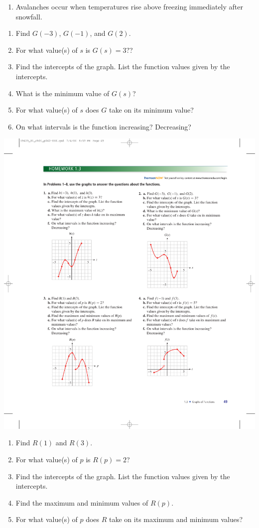 \documentclass[10pt,]{book}
\theoremstyle{plain}
\theoremstyle{definition}
\theoremstyle{definition}
\theoremstyle{definition}
\theoremstyle{definition}
\numberwithin{equation}{part}
\begin{document}
\begin{exercisegroup}
\begin{enumerate}[label=*\alph**]
\item\hypertarget{li-662}{}Avalanches occur when temperatures rise above freezing immediately after snowfall.%
\end{enumerate}
%
\exercise[2.]\hypertarget{exercise-159}{}\leavevmode%
\begin{enumerate}[label=*\alph**]
\item\hypertarget{li-663}{}Find \(G(-3)\), \(G(-1)\), and \(G(2)\).%
\item\hypertarget{li-664}{}For what value(s) of \(s\) is \(G(s) = 3?\)?%
\item\hypertarget{li-665}{}Find the intercepts of the graph. List the function values given by the intercepts.%
\item\hypertarget{li-666}{}What is the minimum value of \(G(s)\)?%
\item\hypertarget{li-667}{}For what value(s) of \(s\) does \(G\) take on its minimum value?%
\item\hypertarget{li-668}{}On what intervals is the function increasing? Decreasing?%
\end{enumerate}
 \includegraphics[width=0.5\linewidth]{images/fig-ex-1-3-2}
%
\exercise[3.]\hypertarget{exercise-160}{}\leavevmode%
\begin{enumerate}[label=*\alph**]
\item\hypertarget{li-669}{}Find \(R(1)\) and \(R(3)\).%
\item\hypertarget{li-670}{}For what value(s) of \(p\) is \(R(p)=2\)?%
\item\hypertarget{li-671}{}Find the intercepts of the graph. List the function values given by the intercepts.%
\item\hypertarget{li-672}{}Find the maximum and minimum values of \(R(p)\).%
\item\hypertarget{li-673}{}For what value(s) of \(p\) does \(R\) take on its maximum and minimum values?%

\end{enumerate}
\end{exercisegroup}
\end{document}
